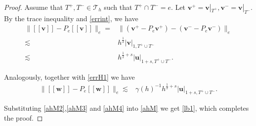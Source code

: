 \documentclass[10pt,a4paper]{amsart}
\def\T{{\mathcal{T}}}
\def\bu{{\mathbf{u}}}
\def\bv{{\mathbf{v}}}
\def\bw{{\mathbf{w}}}
\begin{document}
\begin{proof}
	Assume that $T^+,T^-\in\T_h$ such that $T^+\cap T^-=e$. Let $\bv^+=\bv|_{T^+},\bv^-=\bv|_{T^-}$. By the trace inequality and \eqref{errint}, we have
	\begin{align}\label{ahM3}
		\big\|[\![\bv]\!]-P_e[\![\bv]\!]\big\|_e=&
		\big\|(\bv^+-P_e\bv^+)-(\bv^--P_e\bv^-)\big\|_e\nonumber
		\\
		\lesssim&h^{\frac{1}{2}}|\bv|_{1,T^+\cup T^-}
		\\
		\lesssim& h^{\frac{1}{2}+s}|\bu|_{1+s,T^+\cup T^-}.\nonumber
	\end{align}
	
	Analogously, together with \eqref{errH1} we have
	\begin{align}\label{ahM4}
		\big\|[\![\bw]\!]-P_e[\![\bw]\!]\big\|_e
		\lesssim& \gamma(h)^{-1}h^{\frac{1}{2}+s}|\bu|_{1+s,T^+\cup T^-}.
	\end{align}
	
	Substituting \eqref{ahM2},\eqref{ahM3} and \eqref{ahM4} into \eqref{ahM} we get \eqref{lb1}, which completes the proof.
\end{proof}
\end{document}
